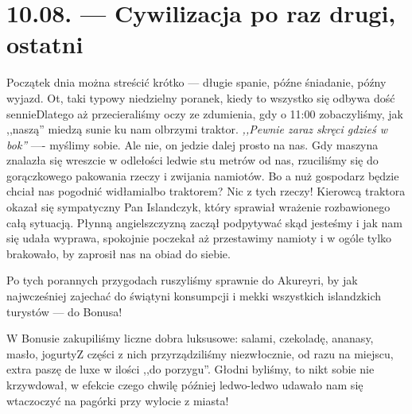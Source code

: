 \chapter*{10.08. --- Cywilizacja po raz drugi, ostatni}

Początek dnia można streścić krótko --- długie spanie, późne śniadanie, późny wyjazd. Ot, taki typowy niedzielny poranek, kiedy to wszystko się odbywa dość sennie\textellipsis Dlatego aż przecieraliśmy oczy ze zdumienia, gdy o 11:00 zobaczyliśmy, jak ,,naszą'' miedzą sunie ku nam olbrzymi traktor. \emph{,,Pewnie zaraz skręci gdzieś w bok''} ---- myślimy sobie. Ale nie, on jedzie dalej prosto na nas. Gdy maszyna znalazła się wreszcie w odlełości ledwie stu metrów od nas, rzuciliśmy się do gorączkowego pakowania rzeczy i zwijania namiotów. Bo a nuż gospodarz będzie chciał nas pogodnić widłami\textellipsis albo traktorem? Nic z tych rzeczy! Kierowcą traktora okazał się sympatyczny Pan Islandczyk, który sprawiał wrażenie rozbawionego całą sytuacją. Płynną angielszczyzną zaczął podpytywać skąd jesteśmy i jak nam się udała wyprawa, spokojnie poczekał aż przestawimy namioty i w ogóle tylko brakowało, by zaprosił nas na obiad do siebie.

Po tych porannych przygodach ruszyliśmy sprawnie do Akureyri, by jak najwcześniej zajechać do świątyni konsumpcji i mekki wszystkich islandzkich turystów --- do Bonusa!


W Bonusie zakupiliśmy liczne dobra luksusowe: salami, czekoladę, ananasy, masło, jogurty\textellipsis Z części z nich przyrządziliśmy niezwłocznie, od razu na miejscu, extra paszę de luxe w ilości ,,do porzygu''. Głodni byliśmy, to nikt sobie nie krzywdował, w efekcie czego chwilę później ledwo-ledwo udawało nam się wtaczoczyć na pagórki przy wylocie z miasta!


